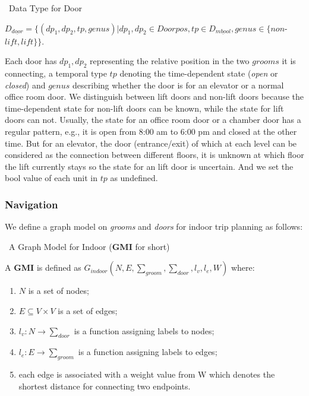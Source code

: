 \begin{Statement}
\label{door}
\ Data Type for Door  

$D_{\underline{door}}=\{(dp_1, dp_2,tp,genus)|dp_1,dp_2 \in Doorpos,tp \in D_{\underline{mbool}},genus \in \{non$-$lift,lift\}\}$.
\end{Statement}

Each door has $dp_1,dp_2$ representing the relative position in the two $grooms$ it is connecting,
a temporal type $tp$ denoting the time-dependent state (\textit{open} or \textit{closed}) and 
$genus$ describing whether the door is for an elevator or a normal office room door. We distinguish between lift doors and non-lift doors because the time-dependent state for non-lift doors can be known, while the state for lift doors can not. Usually, the state for an office room door or a chamber door has a regular pattern, e.g., it is open from 8:00 am to 6:00 pm and closed at the other time. But for an elevator, the door (entrance/exit) of which at each level can be considered as the connection between different floors, it is unknown at which floor the lift currently stays so the state for an lift door is uncertain. And we set the bool value of each unit in $tp$ as undefined. 

\subsubsection{Navigation}
\label{sec:navigation}
We define a graph model on \textit{grooms} and \textit{doors} for indoor trip planning as follows: 

\begin{Statement}
\label{indoorgraph}
\ A Graph Model for Indoor (\textbf{GMI} for short) 

A \textbf{GMI} is defined as $G_{indoor}(N,E,\sum_{groom},\sum_{door},l_v,l_e,W)$ where: 

\begin{enumerate}
 \item $N$ is a set of nodes;
 \item $E\subseteq V \times V$ is a set of edges;
 \item $l_v: N\rightarrow \sum_{door}$ is a function assigning labels to nodes;
 \item $l_e:E \rightarrow \sum_{groom}$ is a function assigning labels to edges;
 \item each edge is associated with a weight value from W which denotes the shortest 
distance for connecting two endpoints. 
\end{enumerate}
\end{Statement}

